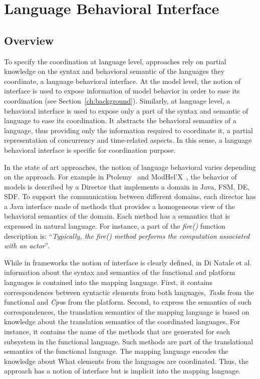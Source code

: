 \section{Language Behavioral Interface}
\subsection{Overview}
To specify the coordination at language level, approaches rely on partial knowledge on the syntax and behavioral semantic of the languages they coordinate, \ie a language behavioral interface. At the model level, the notion of interface is used to expose information of model behavior in order to ease its coordination (see Section~\ref{ch:background}). Similarly, at language level, a behavioral interface is used to expose only a part of the syntax and semantic of language to ease its coordination. It abstracts the behavioral semantics of a language, thus providing only the information required to coordinate it, \ie a partial representation of concurrency and time-related aspects. In this sense, a language behavioral interface is specific for coordination purpose.    

In the state of art approaches, the notion of language behavioral varies depending on the approach. For example in Ptolemy~\cite{ptoleframebib} and ModHel'X~\cite{modhelxbib}, the behavior of models is described by a Director that implements a domain in Java, \eg FSM, DE, SDF. To support the communication between different domains, each director has a Java interface made of methods that provides a homogeneous view of the behavioral semantics of the domain. Each method has a semantics that is expressed in natural language. For instance, a part of the \emph{fire()} function description is: ``\emph{Typically, the fire() method performs the computation associated with an actor}''.
 	
While in frameworks the notion of interface is clearly defined, in Di Natale et al.~\cite{dinatale} information about the syntax and semantics of the functional and platform languages is contained into the mapping language. First, it contains correspondences between syntactic elements from both languages, \eg \emph{Task}s from the functional and \emph{Cpu}s from the platform. Second, to express the semantics of such correspondences, the translation semantics of the mapping language is based on knowledge about the translation semantics of the coordinated languages. For instance, it contains the name of the methods that are generated for each subsystem in the functional language. Such methods are part of the translational semantics of the functional language. The mapping language encodes the knowledge about What elements from the languages are coordinated. Thus, the approach has a notion of interface but is implicit into the mapping language. 

